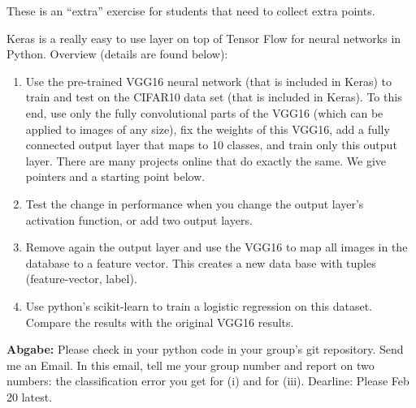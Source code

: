

\renewcommand{\course}{Artificial Intelligence}
\renewcommand{\coursepicture}{course_ai}
\renewcommand{\coursedate}{Winter 2019}
\renewcommand{\exnum}{7}

\exercises
{}
\exercisestitle

These is an ``extra'' exercise for students that need to collect extra points.



Keras is a really easy to use layer on top of Tensor Flow for neural networks in Python. Overview (details are found below):
\begin{enumerate}
\item Use the pre-trained VGG16 neural network (that is included in Keras) to train and test on the CIFAR10 data set (that is included in Keras). To this end, use only the fully convolutional parts of the VGG16 (which can be applied to images of any size), fix the weights of this VGG16, add a fully connected output layer that maps to 10 classes, and train only this output layer.
There are many projects online that do exactly the same. We give
pointers and a starting point below.
\item Test the change in performance when you change the output layer's activation function, or add two output layers.
\item Remove again the output layer and use the VGG16 to map all images in the database to a feature vector. This creates a new data base with tuples (feature-vector, label).
\item Use python's scikit-learn to train a logistic regression on this dataset. Compare the results with the original VGG16 results.
\end{enumerate}

\textbf{Abgabe:} Please check in your python code in your group's git repository. Send me an Email. In this email, tell me your group number and report on two numbers: the classification error you get for (i) and for (iii). Dearline: Please Feb 20 latest.

